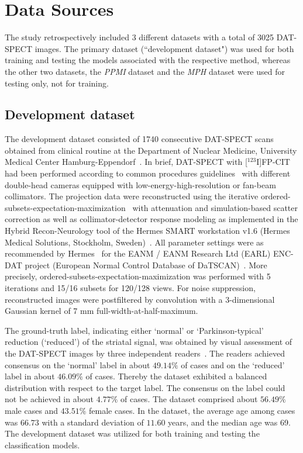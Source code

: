 \section{Data Sources}
\label{sec:data}

The study retrospectively included 3 different datasets with a total of 3025 DAT-SPECT images.
The primary dataset (``development dataset") was used for both training and testing the models associated with the respective method, 
whereas the other two datasets, the \textit{PPMI} dataset and the \textit{MPH} dataset were used for testing only, not for training.

\subsection{Development dataset}
\label{subsec:spect_dataset}

The development dataset consisted of 1740 consecutive DAT-SPECT scans obtained from clinical routine at 
the Department of Nuclear Medicine, University Medical Center Hamburg-Eppendorf~\citep{Schiebler2023}.
In brief, DAT-SPECT with [$^{123}$I]FP-CIT had been performed according to common procedures guidelines~\citep{Darcourt2010-ar, Djang2012-ow} 
with different double-head cameras equipped with low-energy-high-resolution or fan-beam collimators. 
The projection data were reconstructed using the iterative ordered-subsets-expectation-maximization~\citep{Hudson1994} 
with attenuation and simulation-based scatter correction 
as well as collimator-detector response modeling as implemented in the Hybrid Recon-Neurology tool 
of the Hermes SMART workstation v1.6 (Hermes Medical Solutions, Stockholm, Sweden)~\citep{Diemling2021-mg, Sohlberg2012-ep, HybridRecon, Kangasmaa2016-aw}.
All parameter settings were as recommended by Hermes~\citep{Diemling2021-mg} for the EANM / EANM Research Ltd (EARL) ENC-DAT project (European Normal Control Database of DaTSCAN)~\citep{Tossici-Bolt2011-cx, Dickson2010-fm, Varrone2013-it, Tossici-Bolt2017-xj, Dickson2012-hk}.
More precisely, ordered-subsets-expectation-maximization was performed with 5 iterations and 15/16 subsets for 120/128 views. 
For noise suppression, reconstructed images were postfiltered by convolution with a 3-dimensional Gaussian kernel of 7 mm full-width-at-half-maximum. 

The ground-truth label, indicating either `normal' or `Parkinson-typical' reduction (`reduced') of the striatal signal, 
was obtained by visual assessment of the DAT-SPECT images by three independent readers~\citep{Schiebler2023}. 
The readers achieved consensus on the `normal' label in about $49.14\%$ of cases 
and on the `reduced' label in about $46.09\%$ of cases.
Thereby the dataset exhibited a balanced distribution with respect to the target label.
The consensus on the label could not be achieved in about $4.77\%$ of cases.
The dataset comprised about $56.49\%$ male cases and $43.51\%$ female cases.
In the dataset, the average age among cases was $66.73$ with a standard deviation of $11.60$ years, 
and the median age was 69.
The development dataset was utilized for both training and testing the classification models. 

